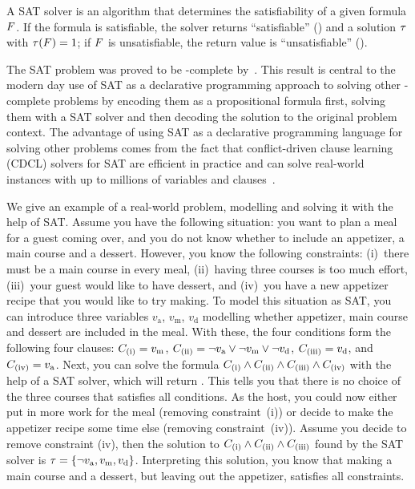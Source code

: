 A SAT solver is an algorithm that determines the satisfiability of a given formula $F$.
If the formula is satisfiable, the solver returns ``satisfiable'' (\sat{}) and a solution $\tau$ with $\tau(F)=1$;
if $F$ is unsatisfiable, the return value is ``unsatisfiable'' (\unsat{}).

The SAT problem was proved to be \NP-complete by~\textcite{DBLP:conf/stoc/Cook71}.
This result is central to the modern day use of SAT as a declarative programming approach to solving other \NP-complete problems by encoding them as a propositional formula first, solving them with a SAT solver and then decoding the solution to the original problem context.
The advantage of using SAT as a declarative programming language for solving other problems comes from the fact that conflict-driven clause learning (CDCL) solvers for SAT are efficient in practice and can solve real-world instances with up to millions of variables and clauses~\autocite{handbook2-cdcl}.

\begin{example}\label{ex:sat-modelling}
  We give an example of a real-world problem, modelling and solving it with the help of SAT.
  Assume you have the following situation:
  you want to plan a meal for a guest coming over, and you do not know whether to include an appetizer, a main course and a dessert.
  However, you know the following constraints:
  (i)~there must be a main course in every meal, (ii)~having three courses is too much effort, (iii)~your guest would like to have dessert, and (iv)~you have a new appetizer recipe that you would like to try making.
  To model this situation as SAT, you can introduce three variables $v_\text{a}$, $v_\text{m}$, $v_\text{d}$ modelling whether appetizer, main course and dessert are included in the meal.
  With these, the four conditions form the following four clauses:
  $C_\text{(i)} = v_\text{m}$, $C_\text{(ii)} = \lnot v_\text{a} \lor \lnot v_\text{m} \lor \lnot v_\text{d}$, $C_\text{(iii)} = v_\text{d}$, and $C_\text{(iv)} = v_\text{a}$.
  Next, you can solve the formula $C_\text{(i)} \land C_\text{(ii)} \land C_\text{(iii)} \land C_\text{(iv)}$ with the help of a SAT solver, which will return \unsat{}.
  This tells you that there is no choice of the three courses that satisfies all conditions.
  As the host, you could now either put in more work for the meal (removing constraint~(i)) or decide to make the appetizer recipe some time else (removing constraint~(iv)).
  Assume you decide to remove constraint (iv), then the solution to $C_\text{(i)} \land C_\text{(ii)} \land C_\text{(iii)}$ found by the SAT solver is $\tau = \{ \lnot v_\text{a}, v_\text{m}, v_\text{d} \}$.
  Interpreting this solution, you know that making a main course and a dessert, but leaving out the appetizer, satisfies all constraints.
\end{example}

